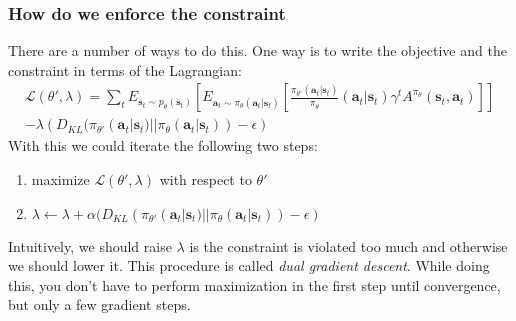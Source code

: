\documentclass{report}
\begin{document}
\subsubsection{How do we enforce the constraint}
There are a number of ways to do this.
One way is to write the objective and the constraint in terms of the Lagrangian:
\begin{equation}
		\begin{split}
\mathcal{L} (\theta', \lambda) =
\sum_{t}^{} E_{ \bm{s}_{t}\sim p_{ \theta } (\bm{s}_{t})}
\left[ E_{ \bm{a}_{t} \sim \pi_{ \theta }(\bm{a}_{t}| \bm{s}_{t} ) } 
\left[ \frac{\pi_{ \theta' }(\bm{a}_{t}| \bm{s}_{t} )}{\pi_\theta} (\bm{a}_{t}| \bm{s}_{t} )\gamma^{ t } A^{ \pi_{ \theta } } (\bm{s}_{t}, \bm{a}_{t} ) \right] 
\right] \\
- \lambda \left( 
D_{ KL } (\pi_{ \theta' } (\bm{a}_{t}| \bm{s}_{t} ) || \pi_{ \theta }(\bm{a}_{t}| \bm{s}_{t} ) )
 - \epsilon \right) 
		\end{split}
\end{equation}
With this we could iterate the following two steps:
\begin{enumerate}
		\item maximize $ \mathcal{L} (\theta', \lambda)  $ with respect to $ \theta'  $
		\item $ \lambda \leftarrow \lambda + \alpha (D_{ KL } (\pi_{ \theta' } (\bm{a}_{t}| \bm{s}_{t} ) || \pi_{ \theta }(\bm{a}_{t}| \bm{s}_{t} )) -\epsilon)  $
\end{enumerate}
Intuitively, we should raise $ \lambda   $ is the constraint is violated too much
and otherwise we should lower it.
This procedure is called \textit{dual gradient descent}.
While doing this, you don't have to perform maximization in the first step until convergence,
but only a few gradient steps.
\end{document}

